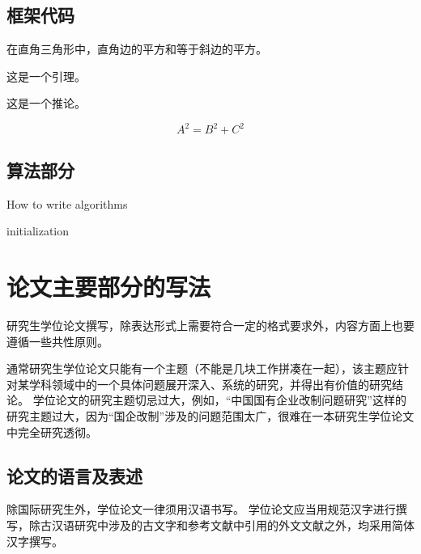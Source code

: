 \section{框架代码}
\begin{theorem}[毕达哥拉斯定理]
  在直角三角形中，直角边的平方和等于斜边的平方。
\end{theorem}

\begin{lemma}
  这是一个引理。
\end{lemma}

\begin{corollary}
  这是一个推论。
\end{corollary}

\begin{equation}
  A^2=B^2+C^2
\end{equation}


\section{算法部分}
\begin{algorithm}[htb]
  \caption{How to write algorithms}
  \label{algo:algo2}
  initialization\;
\end{algorithm}

\chapter{论文主要部分的写法}

研究生学位论文撰写，除表达形式上需要符合一定的格式要求外，内容方面上也要遵循一些共性原则。

通常研究生学位论文只能有一个主题（不能是几块工作拼凑在一起），该主题应针对某学科领域中的一个具体问题展开深入、系统的研究，并得出有价值的研究结论。
学位论文的研究主题切忌过大，例如，“中国国有企业改制问题研究”这样的研究主题过大，因为“国企改制”涉及的问题范围太广，很难在一本研究生学位论文中完全研究透彻。



\section{论文的语言及表述}

除国际研究生外，学位论文一律须用汉语书写。
学位论文应当用规范汉字进行撰写，除古汉语研究中涉及的古文字和参考文献中引用的外文文献之外，均采用简体汉字撰写。

